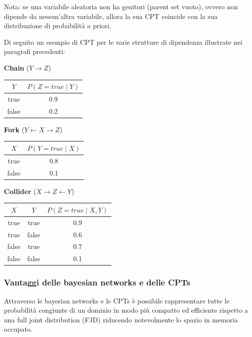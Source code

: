 Nota: se una variabile aleatoria non ha genitori (parent set vuoto), ovvero non dipende da nessun'altra variabile, allora
la sua CPT coincide con la sua distribuzione di probabilità a priori.

Di seguito un esempio di CPT per le varie strutture di dipendenza illustrate nei paragrafi precedenti:
\begin{center}
	\begin{minipage}{0.29\textwidth}
		\centering
		\textbf{Chain} (\(Y \to Z\)) \\[5pt]
		\begin{tabular}{c|c}
			\toprule
			\(Y\) & \(P(Z=true \mid Y)\) \\
			\midrule
			true & 0.9 \\
			false & 0.2 \\
			\bottomrule
		\end{tabular}
	\end{minipage}
	\begin{minipage}{0.29\textwidth}
		\centering
		\textbf{Fork} (\(Y \leftarrow X \rightarrow Z\)) \\[5pt]
		\begin{tabular}{c|c}
			\toprule
			\(X\) & \(P(Y=true \mid X)\) \\
			\midrule
			true & 0.8 \\
			false & 0.1 \\
			\bottomrule
		\end{tabular}
	\end{minipage}
	\begin{minipage}{0.39\textwidth}
		\centering
		\textbf{Collider} (\(X \to Z \leftarrow Y\)) \\[5pt]
		\begin{tabular}{c c|c}
			\toprule
			\(X\) & \(Y\) & \(P(Z=true \mid X, Y)\) \\
			\midrule
			true & true & 0.9 \\
			true & false & 0.6 \\
			false & true & 0.7 \\
			false & false & 0.1 \\
			\bottomrule
		\end{tabular}
	\end{minipage}
\end{center}

\subsubsection*{Vantaggi delle bayesian networks e delle CPTs}
Attraverso le bayesian networks e le CPTs è possibile rappresentare tutte le probabilità congiunte di un dominio in modo
più compatto ed efficiente rispetto a una full joint distribution (FJD) riducendo notevolmente lo spazio in memoria
occupato.

